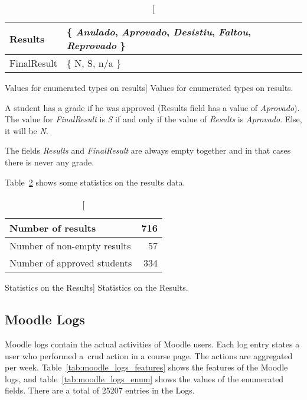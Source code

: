 \begin{table}[h!]
    \centering

    \begin{tabular}{| l | l |}
        \hline
        Results & \{ \textit{Anulado},
                     \textit{Aprovado},
                     \textit{Desistiu},
                     \textit{Faltou},
                     \textit{Reprovado}
                  \} \\ \hline
        FinalResult & \{ N, S, n/a \}  \\ \hline
    \end{tabular}

    \caption
        [Values for enumerated types on results]
        {Values for enumerated types on results.}

    \label{tab:results_fetures_enum}
\end{table}

A student has a grade if he was approved (Results field has a value of
\textit{Aprovado}). The value for \textit{FinalResult} is \textit{S} if and
only if the value of \textit{Results} is \textit{Aprovado}. Else, it will be
\textit{N}.

The fields \textit{Results} and \textit{FinalResult} are always empty together
and in that cases there is never any grade.

Table~\ref{tab:results_stats} shows some statistics on the results data.

\begin{table}[h!]
    \centering

    \begin{tabular}{| l | r |}
        \hline
        Number of results           & 716 \\ \hline
        Number of non-empty results & 57  \\ \hline
        Number of approved students & 334 \\ \hline
    \end{tabular}

    \caption
        [Statistics on the Results]
        {Statistics on the Results.}

    \label{tab:results_stats}
\end{table}

\subsection{Moodle Logs}

Moodle logs contain the actual activities of Moodle users. Each log entry
states a user who performed a~\gls{crud} action in a course page. The actions
are aggregated per week. Table~\ref{tab:moodle_logs_features} shows the
features of the Moodle logs, and table~\ref{tab:moodle_logs_enum} shows the
values of the enumerated fields. There are a total of 25207 entries in the
Logs.

